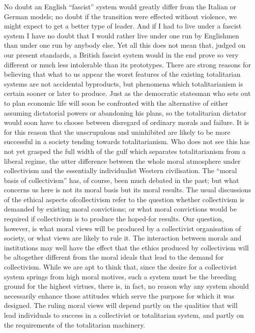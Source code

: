 \documentclass[11pt,openany]{book}
\begin{document}
No doubt an English ``fascist'' system would greatly differ from the Italian or German models; no doubt if the transition were effected without violence, we might expect to get a better type of leader. And if I had to live under a fascist system I have no doubt that I would rather live under one run by Englishmen than under one run by anybody else. Yet all this does not mean that, judged on our present standards, a British fascist system would in the end prove so very different or much less intolerable than its prototypes. There are strong reasons for believing that what to us appear the worst features of the existing totalitarian systems are not accidental byproducts, but phenomena which totalitarianism is certain sooner or later to produce. Just as the democratic statesman who sets out to plan economic life will soon be confronted with the alternative of either assuming dictatorial powers or abandoning his plans, so the totalitarian dictator would soon have to choose between disregard of ordinary morals and failure. It is for this reason that the unscrupulous and uninhibited are likely to be more successful in a society tending towards totalitarianism. Who does not see this has not yet grasped the full width of the gulf which separates totalitarianism from a liberal regime, the utter difference between the whole moral atmosphere under collectivism and the essentially individualist Western civilisation. The ``moral basis of collectivism'' has, of course, been much debated in the past; but what concerns us here is not its moral basis but its moral results. The usual discussions of the ethical aspects ofcollectivism refer to the question whether collectivism is demanded by existing moral convictions; or what moral convictions would be required if collectivism is to produce the hoped-for results. Our question, however, is what moral views will be produced by a collectivist organisation of society, or what views are likely to rule it. The interaction between morals and institutions may well have the effect that the ethics produced by collectivism will be altogether different from the moral ideals that lead to the demand for collectivism. While we are apt to think that, since the desire for a collectivist system springs from high moral motives, such a system must be the breeding ground for the highest virtues, there is, in fact, no reason why any system should necessarily enhance those attitudes which serve the purpose for which it was designed. The ruling moral views will depend partly on the qualities that will lead individuals to success in a collectivist or totalitarian system, and partly on the requirements of the totalitarian machinery.
\end{document}
